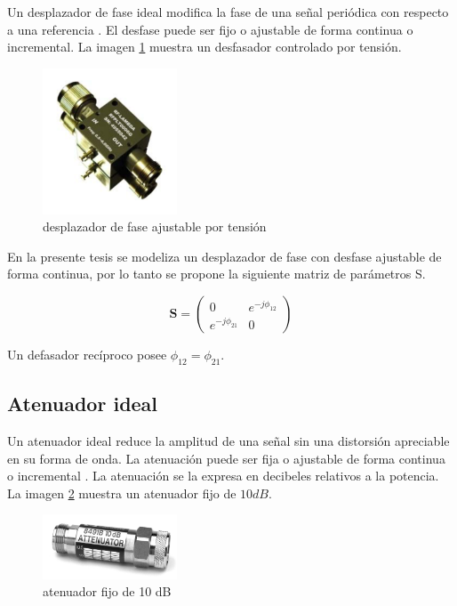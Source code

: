 Un desplazador de fase ideal modifica la fase de una señal periódica con respecto a una referencia \cite{Standard1996}. El 
desfase puede ser fijo o ajustable de forma continua o incremental. La imagen \ref{fig:phaseShifter} muestra un desfasador 
controlado por tensión.

\begin{figure}[H]
 \centering
 \includegraphics[width=4cm]{gfx/phaseShifter.png}
 \caption{desplazador de fase ajustable por tensión \cite{Shifter}}
 \label{fig:phaseShifter}
\end{figure}

En la presente tesis se modeliza un desplazador de fase con desfase ajustable de forma continua, por lo tanto se propone la 
siguiente matriz de parámetros S.

$$
\mathbf{S} = \begin{pmatrix} 0 & e^{-j\phi_{12}}\\e^{-j\phi_{21}} & 0\end{pmatrix}
$$

Un defasador recíproco posee $\phi_{12} = \phi_{21}$.

\subsection{Atenuador ideal}

Un atenuador ideal reduce la amplitud de una señal sin una distorsión apreciable en su forma de onda. La atenuación puede ser
fija o ajustable de forma continua o incremental \cite{Standard1996}. La atenuación se la expresa en decibeles relativos a la
potencia. La imagen \ref{fig:attenuator} muestra un atenuador fijo de $10 dB$.

\begin{figure}[H]
 \centering
 \includegraphics[width=4cm]{gfx/attenuator.png}
 \caption{atenuador fijo de 10 dB \cite{Keysight2014}}
 \label{fig:attenuator}
\end{figure}

